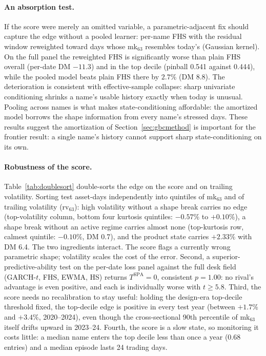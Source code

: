 \documentclass[11pt]{article}
\theoremstyle{remark}
\begin{document}
\paragraph{An absorption test.} If the score were merely an omitted
variable, a parametric-adjacent fix should capture the edge without a
pooled learner: per-name FHS with the residual window reweighted
toward days whose mk$_{63}$ resembles today's (Gaussian kernel). On
the full panel the reweighted FHS is significantly worse than
plain FHS overall (per-date DM $-11.3$) and in the top decile (pinball
0.541 against 0.444), while the pooled model beats plain FHS there by
$2.7\%$ (DM 8.8). The deterioration is consistent with effective-sample collapse: sharp
univariate conditioning shrinks a name's usable history exactly when
today is unusual. Pooling across names is what makes state-conditioning affordable: the amortized model borrows the shape information from every name's
stressed days. These results suggest the amortization of Section~\ref{sec:gbcmethod} is
important for the frontier result: a single name's history cannot
support sharp state-conditioning on its own.

\paragraph{Robustness of the score.} Table~\ref{tab:doublesort} double-sorts the edge on the score and on
trailing volatility. Sorting
test asset-days independently into quintiles of mk$_{63}$ and of
trailing volatility (rv$_{63}$): high volatility without a shape break
carries no edge (top-volatility column, bottom four kurtosis quintiles:
$-0.57\%$ to $+0.10\%$), a shape break without an active regime
carries almost none (top-kurtosis row, calmest quintile: $-0.10\%$,
DM 0.7), and the product state carries $+2.33\%$ with DM 6.4. The two ingredients interact. The score flags a currently wrong
parametric shape; volatility scales the cost of the error. Second, a
superior-predictive-ability test \citep{hansen2005spa} on the per-date
loss panel against the full desk field (GARCH-$t$, FHS, EWMA, HS)
returns $T^{\mathrm{SPA}} = 0$, consistent $p = 1.00$: no rival's
advantage is even positive, and each is individually worse with
$t \geq 5.8$. Third, the score needs no recalibration to stay useful:
holding the design-era top-decile threshold fixed, the top-decile edge
is positive in every test year (between $+1.7\%$ and $+3.4\%$,
2020--2024), even though the cross-sectional 90th percentile of
mk$_{63}$ itself drifts upward in 2023--24. Fourth, the score is a slow
state, so monitoring it costs little: a median name enters the top
decile less than once a year (0.68 entries) and a median episode lasts
24 trading days.
\end{document}
